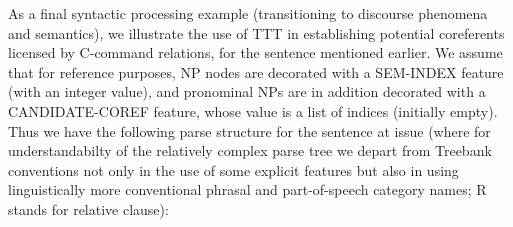 \documentclass[a4,11pt]{article}
\begin{document}
As a final syntactic processing example (transitioning to discourse phenomena and semantics), we illustrate the use of TTT in establishing potential coreferents licensed by C-command relations, for the sentence mentioned earlier. We assume that for reference purposes, NP nodes are decorated with a SEM-INDEX feature (with an integer value), and pronominal NPs are in addition decorated with a CANDIDATE-COREF feature, whose value is a list of indices (initially empty). Thus we have the following parse structure for the sentence at issue (where for understandabilty of the relatively complex parse tree we depart from Treebank conventions not only in the use of some explicit features but also in using linguistically more conventional phrasal and part-of-speech category names; R stands for relative clause):

\end{document}
